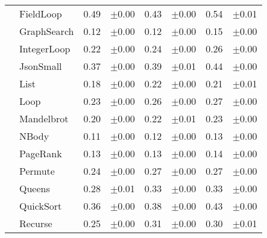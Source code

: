 \begin{tabular}{llrlrlrl}
 & FieldLoop & 0.49 & \scriptsize\textcolor{gray!60}{$\pm$0.00} & 0.43 & \scriptsize\textcolor{gray!60}{$\pm$0.00} & 0.54 & \scriptsize\textcolor{gray!60}{$\pm$0.01} \\
 & GraphSearch & 0.12 & \scriptsize\textcolor{gray!60}{$\pm$0.00} & 0.12 & \scriptsize\textcolor{gray!60}{$\pm$0.00} & 0.15 & \scriptsize\textcolor{gray!60}{$\pm$0.00} \\
 & IntegerLoop & 0.22 & \scriptsize\textcolor{gray!60}{$\pm$0.00} & 0.24 & \scriptsize\textcolor{gray!60}{$\pm$0.00} & 0.26 & \scriptsize\textcolor{gray!60}{$\pm$0.00} \\
 & JsonSmall & 0.37 & \scriptsize\textcolor{gray!60}{$\pm$0.00} & 0.39 & \scriptsize\textcolor{gray!60}{$\pm$0.01} & 0.44 & \scriptsize\textcolor{gray!60}{$\pm$0.00} \\
 & List & 0.18 & \scriptsize\textcolor{gray!60}{$\pm$0.00} & 0.22 & \scriptsize\textcolor{gray!60}{$\pm$0.00} & 0.21 & \scriptsize\textcolor{gray!60}{$\pm$0.01} \\
 & Loop & 0.23 & \scriptsize\textcolor{gray!60}{$\pm$0.00} & 0.26 & \scriptsize\textcolor{gray!60}{$\pm$0.00} & 0.27 & \scriptsize\textcolor{gray!60}{$\pm$0.00} \\
 & Mandelbrot & 0.20 & \scriptsize\textcolor{gray!60}{$\pm$0.00} & 0.22 & \scriptsize\textcolor{gray!60}{$\pm$0.01} & 0.23 & \scriptsize\textcolor{gray!60}{$\pm$0.00} \\
 & NBody & 0.11 & \scriptsize\textcolor{gray!60}{$\pm$0.00} & 0.12 & \scriptsize\textcolor{gray!60}{$\pm$0.00} & 0.13 & \scriptsize\textcolor{gray!60}{$\pm$0.00} \\
 & PageRank & 0.13 & \scriptsize\textcolor{gray!60}{$\pm$0.00} & 0.13 & \scriptsize\textcolor{gray!60}{$\pm$0.00} & 0.14 & \scriptsize\textcolor{gray!60}{$\pm$0.00} \\
 & Permute & 0.24 & \scriptsize\textcolor{gray!60}{$\pm$0.00} & 0.27 & \scriptsize\textcolor{gray!60}{$\pm$0.00} & 0.27 & \scriptsize\textcolor{gray!60}{$\pm$0.00} \\
 & Queens & 0.28 & \scriptsize\textcolor{gray!60}{$\pm$0.01} & 0.33 & \scriptsize\textcolor{gray!60}{$\pm$0.00} & 0.33 & \scriptsize\textcolor{gray!60}{$\pm$0.00} \\
 & QuickSort & 0.36 & \scriptsize\textcolor{gray!60}{$\pm$0.00} & 0.38 & \scriptsize\textcolor{gray!60}{$\pm$0.00} & 0.43 & \scriptsize\textcolor{gray!60}{$\pm$0.00} \\
 & Recurse & 0.25 & \scriptsize\textcolor{gray!60}{$\pm$0.00} & 0.31 & \scriptsize\textcolor{gray!60}{$\pm$0.00} & 0.30 & \scriptsize\textcolor{gray!60}{$\pm$0.01} \\

\end{tabular}
